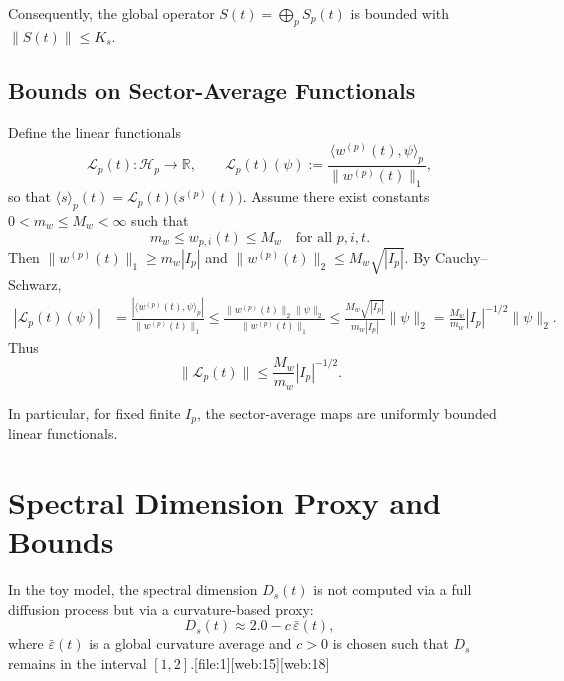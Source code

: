 \documentclass[11pt]{article}
\begin{document}
Consequently, the global operator \(S(t) = \bigoplus_p S_p(t)\) is bounded
with \(\|S(t)\| \leq K_s\).

\subsection{Bounds on Sector-Average Functionals}

Define the linear functionals
\begin{equation}
  \mathcal{L}_p(t) : \mathcal{H}_p \to \mathbb{R},
  \qquad
  \mathcal{L}_p(t)(\psi)
    := \frac{\langle w^{(p)}(t), \psi \rangle_p}
             {\|w^{(p)}(t)\|_1},
\end{equation}
so that \(\langle s \rangle_p(t) = \mathcal{L}_p(t)\bigl(s^{(p)}(t)\bigr)\).
Assume there exist constants \(0 < m_w \leq M_w < \infty\) such that
\[
  m_w \leq w_{p,i}(t) \leq M_w
  \quad\text{for all } p,i,t.
\]
Then \(\|w^{(p)}(t)\|_1 \geq m_w |I_p|\) and
\(\|w^{(p)}(t)\|_2 \leq M_w \sqrt{|I_p|}\). By Cauchy--Schwarz,
\begin{align*}
  |\mathcal{L}_p(t)(\psi)|
    &= \frac{
         |\langle w^{(p)}(t), \psi \rangle_p|
       }{
         \|w^{(p)}(t)\|_1
       }
     \leq \frac{
         \|w^{(p)}(t)\|_2 \|\psi\|_2
       }{
         \|w^{(p)}(t)\|_1
       }
     \leq \frac{
         M_w \sqrt{|I_p|}
       }{
         m_w |I_p|
       } \|\psi\|_2
     = \frac{M_w}{m_w} |I_p|^{-1/2} \|\psi\|_2.
\end{align*}
Thus
\begin{equation}
  \|\mathcal{L}_p(t)\|
    \leq \frac{M_w}{m_w} |I_p|^{-1/2}.
\end{equation}

In particular, for fixed finite \(I_p\), the sector-average maps are
uniformly bounded linear functionals.

\section{Spectral Dimension Proxy and Bounds}

In the toy model, the spectral dimension \(D_s(t)\) is not computed via a
full diffusion process but via a curvature-based proxy:
\begin{equation}
  D_s(t)
    \approx 2.0 - c\,\bar{\varepsilon}(t),
\end{equation}
where \(\bar{\varepsilon}(t)\) is a global curvature average and \(c>0\)
is chosen such that \(D_s\) remains in the interval \([1,2]\).[file:1][web:15][web:18]
\end{document}
